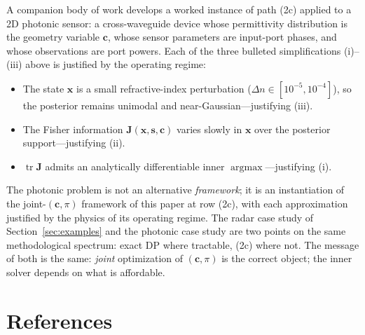\documentclass[11pt,a4paper]{article}
\newcommand{\tr}{\operatorname{tr}}
\newcommand{\argmax}{\operatorname{argmax}}
\begin{document}
A companion body of work develops a worked instance of path (2c) applied to a 2D photonic sensor: a cross-waveguide device whose permittivity distribution is the geometry variable $\bm{c}$, whose sensor parameters are input-port phases, and whose observations are port powers.  Each of the three bulleted simplifications (i)--(iii) above is justified by the operating regime:
\begin{itemize}[leftmargin=2em, nosep]
  \item The state $\bm{x}$ is a small refractive-index perturbation ($\Delta n \in [10^{-5}, 10^{-4}]$), so the posterior remains unimodal and near-Gaussian---justifying (iii).
  \item The Fisher information $\bm{J}(\bm{x},\bm{s},\bm{c})$ varies slowly in $\bm{x}$ over the posterior support---justifying (ii).
  \item $\tr\bm{J}$ admits an analytically differentiable inner $\argmax$---justifying (i).
\end{itemize}

The photonic problem is not an alternative \emph{framework}; it is an instantiation of the joint-$(\bm{c}, \pi)$ framework of this paper at row (2c), with each approximation justified by the physics of its operating regime.  The radar case study of Section~\ref{sec:examples} and the photonic case study are two points on the same methodological spectrum: exact DP where tractable, (2c) where not.  The message of both is the same: \emph{joint} optimization of $(\bm{c}, \pi)$ is the correct object; the inner solver depends on what is affordable.

\section*{References}
\end{document}
